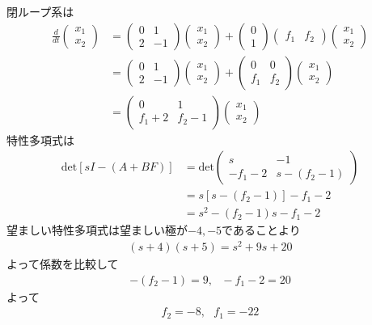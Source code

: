閉ループ系は
\begin{align*}
	\frac{d}{dt}
	\left (
	\begin{array}{c}
	 x_1 \\ x_2 
	\end{array}
	\right )
	& = 
	\left (
	\begin{array}{cc}
	 0 & 1 \\
	 2 & -1
	\end{array}
	\right )
	\left (
	\begin{array}{c}
	 x_1 \\ x_2 
	\end{array}
	\right )
	+
	\left (
	\begin{array}{c}
	 0 \\ 1 
	\end{array}
	\right )
	\left (
	\begin{array}{cc}
	 f_1 & f_2
	\end{array}
	\right )
	\left (
	\begin{array}{c}
	 x_1 \\ x_2 
	\end{array}
	\right )
\\
	&=
	\left (
	\begin{array}{cc}
	 0 & 1 \\
	 2 & -1
	\end{array}
	\right )
	\left (
	\begin{array}{c}
	 x_1 \\ x_2 
	\end{array}
	\right )
	+
	\left (
	\begin{array}{cc}
	 0   & 0   \\
	 f_1 & f_2
	\end{array}
	\right )
	\left (
	\begin{array}{c}
	 x_1 \\ x_2 
	\end{array}
	\right )
\\
	&=
	\left (
	\begin{array}{cc}
	 0 & 1 \\
	 f_1+2 & f_2-1
	\end{array}
	\right )
	\left (
	\begin{array}{c}
	 x_1 \\ x_2 
	\end{array}
	\right )
\end{align*}
特性多項式は
\begin{align*}
	\mbox{det}[sI-(A+BF)]
	& =
	\mbox{det}
	\left (
	\begin{array}{cc}
	 s & - 1 \\
	 - f_1 -2 & s- (f_2-1)
	\end{array}
	\right )
\\
	&= s [s-(f_2-1)] - f_1 -2
\\
	&= s^2 - (f_2-1) s - f_1 -2
\end{align*}
望ましい特性多項式は望ましい極が$-4,-5$であることより
\begin{align*}
	(s+4)(s+5) = s^2 + 9s + 20
\end{align*}
よって係数を比較して
\begin{align*}
	-(f_2-1)=9, \ \ \ -f_1-2 =20
\end{align*}
よって
\begin{align*}
	f_2=-8, \ \ \ f_1=-22
\end{align*}





